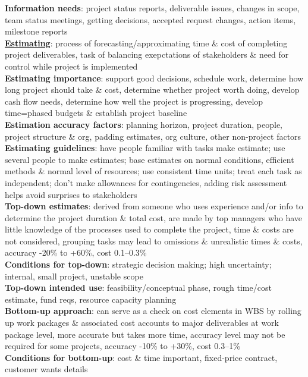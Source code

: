 \documentclass[a4paper]{article}
\begin{document}
\begin{multicols}{3}
        \textbf{Information needs}: project status reports, deliverable issues, changes in scope, team status meetings, getting decisions, accepted request changes, action items, milestone reports\\
        \underline{\textbf{Estimating}}: process of forecasting/approximating time \& cost of completing project deliverables, task of balancing exepctations of stakeholders \& need for control while project is implemented\\
        \textbf{Estimating importance}: support good decisions, schedule work, determine how long project should take \& cost, determine whether project worth doing, develop cash flow needs, determine how well the project is progressing, develop time=phased budgets \& establish project baseline\\
        \textbf{Estimation accuracy factors}: planning horizon, project duration, people, project structure \& org, padding estimates, org culture, other non-project factors\\
        \textbf{Estimating guidelines}: have people familiar with tasks make estimate; use several people to make estimates; base estimates on normal conditions, efficient methods \& normal level of resources; use consistent time units; treat each task as independent; don't make allowances for contingencies, adding risk assessment helps avoid surprises to stakeholders\\
        \textbf{Top-down estimates}: derived from someone who uses experience and/or info to determine the project duration \& total cost, are made by top managers who have little knowledge of the processes used to complete the project, time \& costs are not considered, grouping tasks may lead to omissions \& unrealistic times \& costs, accuracy -20\% to +60\%, cost 0.1--0.3\%\\
        \textbf{Conditions for top-down}: strategic decision making; high uncertainty; internal, small project, unstable scope\\
        \textbf{Top-down intended use}: feasibility/conceptual phase, rough time/cost estimate, fund reqs, resource capacity planning\\
        \textbf{Bottom-up approach}: can serve as a check on cost elements in WBS by rolling up work packages \& associated cost accounts to major deliverables at work package level, more accurate but takes more time, accuracy level may not be required for some projects, accuracy -10\% to +30\%, cost 0.3--1\%\\
        \textbf{Conditions for bottom-up}: cost \& time important, fixed-price contract, customer wants details\\

\end{multicols}
\end{document}
